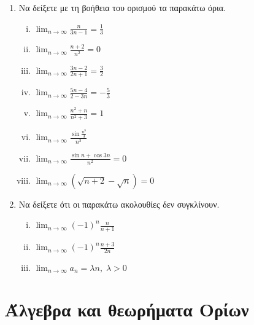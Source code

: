 \begin{enumerate}
    \item Να δείξετε με τη βοήθεια του ορισμού τα παρακάτω όρια.
        \begin{enumerate}[i)]
            \item $ \lim_{n \to \infty} \frac{n}{3n-1} = \frac{1}{3} $
            \item $ \lim_{n \to \infty} \frac{n+2}{n^{2}} = 0 $
            \item $ \lim_{n \to \infty} \frac{3n -2}{2n+1} = \frac{3}{2} $ 
            \item $ \lim_{n \to \infty} \frac{5n-4}{2-3n} = - \frac{5}{3} $ 
            \item $ \lim_{n \to \infty} \frac{n^{2}+n}{n^{2}+3} = 1 $ 
            \item $ \lim_{n \to \infty} \frac{\sin{\frac{n^{3}}{3}}}{n^{3}} $
            \item $ \lim_{n \to \infty} \frac{\sin{n} + \cos{3n}}{n^{2}} = 0 $
            \item $ \lim_{n \to \infty} (\sqrt{n+2} - \sqrt{n}) = 0 $
        \end{enumerate}

    \item Να δείξετε ότι οι παρακάτω ακολουθίες δεν συγκλίνουν.
        \begin{enumerate}[i)]
            \item $ \lim_{n \to \infty} (-1)^{n} \frac{n}{n+1}  $
            \item $ \lim_{n \to \infty} (-1)^{n} \frac{n+3}{2n}  $
            \item $ \lim_{n \to \infty} a_{n} = \lambda n, \; \lambda >0$
        \end{enumerate}
\end{enumerate}

\section{Άλγεβρα και θεωρήματα Ορίων}

